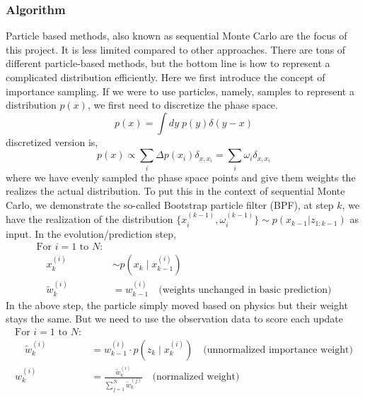 \documentclass{article}
\begin{document}
\subsubsection{Algorithm}
Particle based methods, also known as sequential Monte Carlo are the focus of this project. It is less limited compared to other approaches. There are tons of different particle-based methods, but the bottom line is how to represent a complicated distribution efficiently. Here we first introduce the concept of importance sampling. If we were to use particles, namely, samples to represent a distribution $p(x)$, we first need to discretize the phase space. 
\begin{equation}
    p(x)=\int dy\; p(y) \delta(y-x)
\end{equation} 
discretized version is,
\begin{equation}
    p(x)\propto \sum_i \Delta p(x_i) \delta_{x,x_i}= \sum_i \omega_i \delta_{x,x_i}
\end{equation}
where we have evenly sampled the phase space points and give them weights the realizes the actual distribution. 
To put this in the context of sequential Monte Carlo, we demonstrate the so-called Bootstrap particle filter (BPF), at step $k$, we have the realization of the distribution $\{x^{(k-1)}_i,\omega^{(k-1)}_i\} \sim p(x_{k-1}|z_{1:k-1})$ as input. In the evolution/prediction step,
\begin{equation}
\begin{split}
\text{For } i = 1 \text{ to } N:& \\
\quad x_k^{(i)} &\sim p(x_k \mid x_{k-1}^{(i)}) \\
\quad \tilde{w}_k^{(i)} &= w_{k-1}^{(i)} \quad \text{(weights unchanged in basic prediction)}
\end{split}
\end{equation}
In the above step, the particle simply moved based on physics but their weight stays the same. But we need to use the observation data to score each update
\begin{equation}
\begin{split}
\text{For } i = 1 \text{ to } N:& \\
\quad \tilde{w}_k^{(i)} &= w_{k-1}^{(i)} \cdot p(z_k \mid x_k^{(i)}) \quad \text{(unnormalized importance weight)} \\
w_k^{(i)} &= \frac{\tilde{w}_k^{(i)}}{\sum_{j=1}^N \tilde{w}_k^{(j)}} \quad \text{(normalized weight)}
\end{split}
\end{equation}
\end{document}
